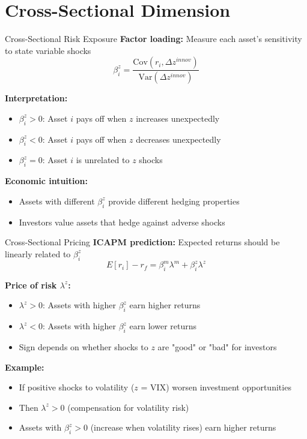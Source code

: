 \documentclass{beamer}
\begin{document}
\section{Cross-Sectional Dimension}

\begin{frame}{Cross-Sectional Risk Exposure}
\textbf{Factor loading:} Measure each asset's sensitivity to state variable shocks
$$\beta_i^z = \frac{\text{Cov}(r_i, \Delta z^{innov})}{\text{Var}(\Delta z^{innov})}$$

\vspace{0.3cm}
\textbf{Interpretation:}
\begin{itemize}
\item $\beta_i^z > 0$: Asset $i$ pays off when $z$ increases unexpectedly
\item $\beta_i^z < 0$: Asset $i$ pays off when $z$ decreases unexpectedly
\item $\beta_i^z = 0$: Asset $i$ is unrelated to $z$ shocks
\end{itemize}

\vspace{0.3cm}
\textbf{Economic intuition:}
\begin{itemize}
\item Assets with different $\beta_i^z$ provide different hedging properties
\item Investors value assets that hedge against adverse shocks
\end{itemize}
\end{frame}

\begin{frame}{Cross-Sectional Pricing}
\textbf{ICAPM prediction:} Expected returns should be linearly related to $\beta_i^z$
$$E[r_i] - r_f = \beta_i^m \lambda^m + \beta_i^z \lambda^z$$

\vspace{0.3cm}
\textbf{Price of risk $\lambda^z$:}
\begin{itemize}
\item $\lambda^z > 0$: Assets with higher $\beta_i^z$ earn higher returns
\item $\lambda^z < 0$: Assets with higher $\beta_i^z$ earn lower returns
\item Sign depends on whether shocks to $z$ are "good" or "bad" for investors
\end{itemize}

\vspace{0.3cm}
\textbf{Example:}
\begin{itemize}
\item If positive shocks to volatility ($z$ = VIX) worsen investment opportunities
\item Then $\lambda^z > 0$ (compensation for volatility risk)
\item Assets with $\beta_i^z > 0$ (increase when volatility rises) earn higher returns
\end{itemize}
\end{frame}
\end{document}
